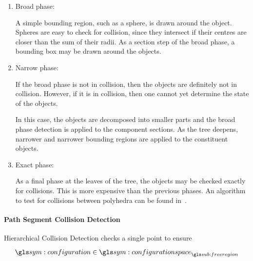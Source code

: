 				\begin{enumerate}

					\item Broad phase:

						A simple bounding region, such as a sphere, is drawn
						around the object. Spheres are easy to check for
						collision, since they intersect if their centres are
						closer than the sum of their radii. As a section step of
						the broad phase, a bounding box may be drawn around the
						objects.

					\item Narrow phase:

						If the broad phase is not in collision, then the objects
						are definitely not in collision. However, if it is in
						collision, then one cannot yet determine the state of
						the objects.

						In this case, the objects are decomposed into smaller
						parts and the broad phase detection is applied to the
						component sections. As the tree deepens, narrower and
						narrower bounding regions are applied to the constituent
						objects.


					\item Exact phase:

						As a final phase at the leaves of the tree, the objects
						may be checked exactly for collisions. This is more
						expensive than the previous phases. An algorithm to test
						for collisions between polyhedra can be found
						in~\cite{bib:planning:detecting_intersections_between_convex_polyhedra}.

				\end{enumerate}

			\paragraph{Path Segment Collision Detection}%
			\label{sec:path_segment_collision_detection}

				Hierarchical Collision Detection checks a single point to ensure

				\begin{equation}
					\configuration \in \configurationspace_{\freeregion}
				\end{equation}

